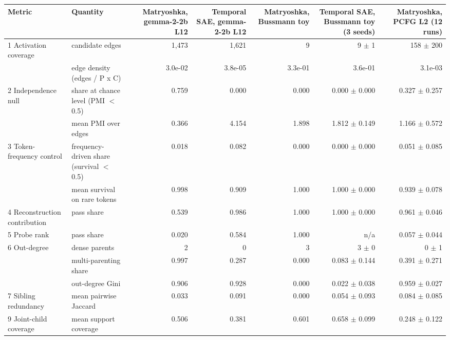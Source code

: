 \begin{tabular}{llrrrrr}
\toprule
Metric & Quantity & Matryoshka, gemma-2-2b L12 & Temporal SAE, gemma-2-2b L12 & Matryoshka, Bussmann toy & Temporal SAE, Bussmann toy (3 seeds) & Matryoshka, PCFG L2 (12 runs) \\
\midrule
1 Activation coverage & candidate edges & 1,473 & 1,621 & 9 & 9 $\pm$ 1 & 158 $\pm$ 200 \\
 & edge density (edges / P x C) & 3.0e-02 & 3.8e-05 & 3.3e-01 & 3.6e-01 & 3.1e-03 \\
2 Independence null & share at chance level (PMI $<$ 0.5) & 0.759 & 0.000 & 0.000 & 0.000 $\pm$ 0.000 & 0.327 $\pm$ 0.257 \\
 & mean PMI over edges & 0.366 & 4.154 & 1.898 & 1.812 $\pm$ 0.149 & 1.166 $\pm$ 0.572 \\
3 Token-frequency control & frequency-driven share (survival $<$ 0.5) & 0.018 & 0.082 & 0.000 & 0.000 $\pm$ 0.000 & 0.051 $\pm$ 0.085 \\
 & mean survival on rare tokens & 0.998 & 0.909 & 1.000 & 1.000 $\pm$ 0.000 & 0.939 $\pm$ 0.078 \\
4 Reconstruction contribution & pass share & 0.539 & 0.986 & 1.000 & 1.000 $\pm$ 0.000 & 0.961 $\pm$ 0.046 \\
5 Probe rank & pass share & 0.020 & 0.584 & 1.000 & n/a & 0.057 $\pm$ 0.044 \\
6 Out-degree & dense parents & 2 & 0 & 3 & 3 $\pm$ 0 & 0 $\pm$ 1 \\
 & multi-parenting share & 0.997 & 0.287 & 0.000 & 0.083 $\pm$ 0.144 & 0.391 $\pm$ 0.271 \\
 & out-degree Gini & 0.906 & 0.928 & 0.000 & 0.022 $\pm$ 0.038 & 0.959 $\pm$ 0.027 \\
7 Sibling redundancy & mean pairwise Jaccard & 0.033 & 0.091 & 0.000 & 0.054 $\pm$ 0.093 & 0.084 $\pm$ 0.085 \\
9 Joint-child coverage & mean support coverage & 0.506 & 0.381 & 0.601 & 0.658 $\pm$ 0.099 & 0.248 $\pm$ 0.122 \\
\bottomrule
\end{tabular}
